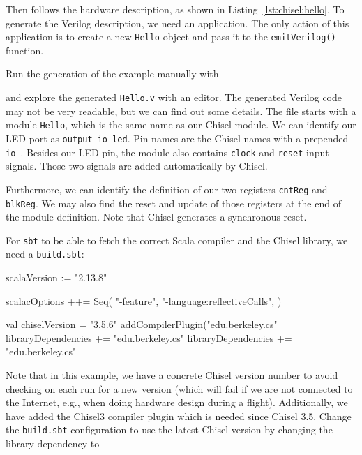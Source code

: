 \documentclass[%
    10pt,
    headinclude, footexclude,
    openright, %
    notitlepage,
    cleardoubleempty,
    headsepline,
    pointlessnumbers,
    bibtotoc, idxtotoc,
    ]{scrbook}
\newcommand{\code}[1]{{\small{\texttt{#1}}}}
\begin{document}

\noindent Then follows the hardware description, as shown in Listing~\ref{lst:chisel:hello}.
To generate the Verilog description, we need an application.
The only action of this application is to create a new \code{Hello} object and pass it
to the \code{emitVerilog()} function.


\noindent Run the generation of the example manually with


and explore the generated \code{Hello.v} with an editor. The generated Verilog code may not be
very readable, but we can find out some details. The file starts with a module \code{Hello},
which is the same name as our Chisel module. We can identify our LED port as
\code{output io\_led}. Pin names are the Chisel names with a prepended \code{io\_}.
Besides our LED pin, the module also contains \code{clock} and \code{reset} input signals.
Those two signals are added automatically by Chisel.

Furthermore, we can identify the definition of our two registers \code{cntReg} and \code{blkReg}.
We may also find the reset and update of those registers at the end of the module definition.
Note that Chisel generates a synchronous reset.

For \code{sbt} to be able to fetch the correct Scala compiler and the Chisel library,
we need a \code{build.sbt}:

\begin{chisel}
scalaVersion := "2.13.8"

scalacOptions ++= Seq(
  "-feature",
  "-language:reflectiveCalls",
)

val chiselVersion = "3.5.6"
addCompilerPlugin("edu.berkeley.cs" %
libraryDependencies += "edu.berkeley.cs" %
libraryDependencies += "edu.berkeley.cs" %

\end{chisel}

\noindent Note that in this example, we have a concrete Chisel version number to avoid checking on
each run for a new version (which will fail if we are not connected to the Internet,
e.g., when doing hardware design during a flight). Additionally, we have added the Chisel3 compiler
plugin which is needed since Chisel 3.5.
Change the \code{build.sbt} configuration to use the latest Chisel version by changing the
library dependency to
\end{document}
